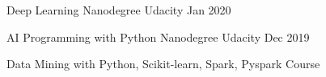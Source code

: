 

\begin{cvhonors}

  \cvhonor
    {Deep Learning} %
    {Nanodegree} %
    {Udacity} %
    {Jan 2020} %

  \cvhonor
    {AI Programming with Python} %
    {Nanodegree} %
    {Udacity} %
    {Dec 2019} %

\end{cvhonors}



\begin{cvhonors}

  \cvhonor
    {Data Mining with Python, Scikit-learn, Spark, Pyspark} %
    {Course} %
    {} %
    {} %

\end{cvhonors}



